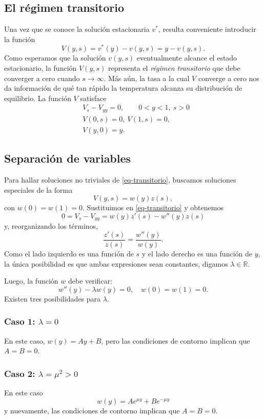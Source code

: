 \documentclass[12pt, a4paper]{amsbook}
\newcommand{\R}{{\mathbb R}}
\theoremstyle{remark}
\theoremstyle{definition}
\numberwithin{section}{chapter}
\numberwithin{subsection}{section}
\numberwithin{equation}{section}
\numberwithin{figure}{chapter}
\begin{document}
\subsection*{El régimen transitorio}

Una vez que se conoce la solución estacionaria $v^*$, resulta conveniente introducir la función
$$
V(y, s) = v^*(y) - v(y, s) = y - v(y, s).
$$
Como esperamos que la solución $v(y, s)$ eventualmente alcance el estado estacionario, la función $V(y, s)$ representa el {\em régimen transitorio} que debe converger a cero cuando $s\to\infty$. Más aún, la tasa a la cual $V$ converge a cero nos da información de qué tan rápido la temperatura alcanza su distribución de equilibrio. La función $V$ satisface
\begin{align}\label{eq-transitorio}
&V_s - V_{yy} = 0,\qquad  0<y<1,\ s>0\\
\label{borde-transitorio}
&V(0,s) = 0,\ V(1,s)=0,\\
\label{inicial-transitorio}
&V(y, 0)=y.
\end{align}

\subsection*{Separación de variables}

Para hallar soluciones no triviales de \eqref{eq-transitorio}, buscamos soluciones especiales de la forma
$$
V(y, s) = w(y)z(s),
$$
con $w(0)=w(1)=0$. Sustituimos en \eqref{eq-transitorio} y obtenemos
$$
0 = V_s - V_{yy} = w(y)z'(s) - w''(y)z(s)
$$
y, reorganizando los términos,
$$
\frac{z'(s)}{z(s)} = \frac{w''(y)}{w(y)}.
$$
Como el lado izquierdo es una función de $s$ y el lado derecho es una función de $y$, la única posibilidad es que ambas expresiones sean constantes, digamos $\lambda\in\R$.

Luego, la función $w$ debe verificar:
\begin{equation}\label{autovw}
w''(y)-\lambda w(y) = 0,\quad w(0)=w(1)=0.
\end{equation}
Existen tres posibilidades para $\lambda$.
\subsubsection*{Caso 1: $\lambda=0$} En este caso, $w(y)=Ay+B$, pero las condiciones de contorno implican que $A=B=0$.

\subsubsection*{Caso 2: $\lambda=\mu^2>0$} En este caso
$$
w(y) = A e^{\mu y} + B e^{-\mu y}
$$
y nuevamente, las condiciones de contorno implican que $A=B=0$.
\end{document}

